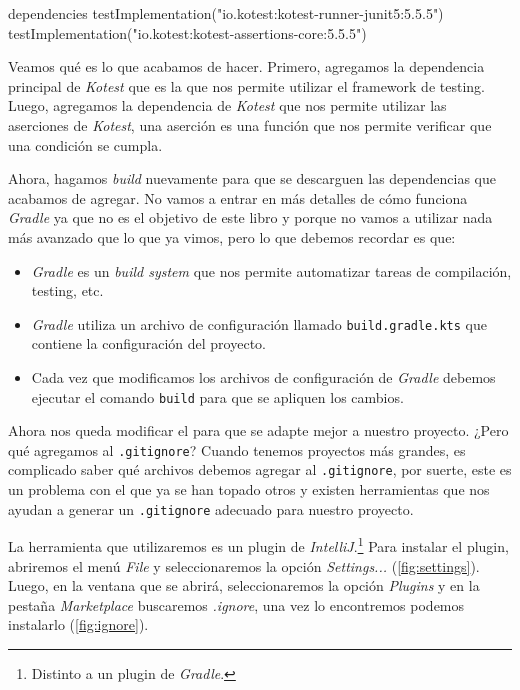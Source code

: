  \begin{kotlin}
    dependencies {
        testImplementation("io.kotest:kotest-runner-junit5:5.5.5")
        testImplementation("io.kotest:kotest-assertions-core:5.5.5")
    }
  \end{kotlin}

  Veamos qué es lo que acabamos de hacer.
  Primero, agregamos la dependencia principal de \textit{Kotest} que es la que nos permite
  utilizar el framework de testing.
  Luego, agregamos la dependencia de \textit{Kotest} que nos permite utilizar las aserciones de 
  \textit{Kotest}, una aserción es una función que nos permite verificar que una condición se 
  cumpla.

  Ahora, hagamos \textit{build} nuevamente para que se descarguen las dependencias que acabamos
  de agregar.
  No vamos a entrar en más detalles de cómo funciona \textit{Gradle} ya que no es el objetivo de
  este libro y porque no vamos a utilizar nada más avanzado que lo que ya vimos, pero lo que debemos
  recordar es que:

  \begin{itemize}
    \item \textit{Gradle} es un \textit{build system} que nos permite automatizar tareas de
      compilación, testing, etc.
    \item \textit{Gradle} utiliza un archivo de configuración llamado \texttt{build.gradle.kts}
      que contiene la configuración del proyecto.
    \item Cada vez que modificamos los archivos de configuración de \textit{Gradle} debemos
      ejecutar el comando \texttt{build} para que se apliquen los cambios.
  \end{itemize}

  Ahora nos queda modificar el  para que se adapte mejor a nuestro 
  proyecto.
  ¿Pero qué agregamos al \texttt{.gitignore}?
  Cuando tenemos proyectos más grandes, es complicado saber qué archivos debemos agregar al
  \texttt{.gitignore}, por suerte, este es un problema con el que ya se han topado otros y existen
  herramientas que nos ayudan a generar un \texttt{.gitignore} adecuado para nuestro proyecto.

  La herramienta que utilizaremos es un plugin de \textit{IntelliJ}.\footnote{
    Distinto a un plugin de \textit{Gradle}.
  }
  Para instalar el plugin, abriremos el menú \textit{File} y seleccionaremos la opción
  \textit{Settings...} (\cref{fig:settings}).
  Luego, en la ventana que se abrirá, seleccionaremos la opción \textit{Plugins} y en la pestaña
  \textit{Marketplace} buscaremos \textit{.ignore}, una vez lo encontremos podemos instalarlo
  (\cref{fig:ignore}).

